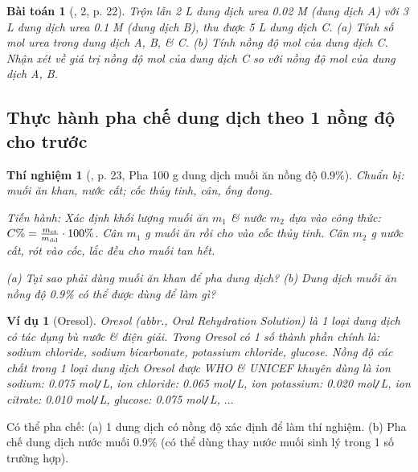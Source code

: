 \documentclass{article}
\newtheorem{baitoan}{Bài toán}
\newtheorem{thinghiem}{Thí nghiệm}
\newtheorem{vidu}{Ví dụ}
\begin{document}
\begin{baitoan}[\cite{SGK_KHTN_8_KNTTVCS}, 2, p. 22]
	Trộn lẫn \emph{2 L} dung dịch urea \emph{0.02 M} (dung dịch A) với \emph{3 L} dung dịch urea \emph{0.1 M} (dung dịch B), thu được \emph{5 L} dung dịch C. (a) Tính số mol urea trong dung dịch A, B, \& C. (b) Tính nồng độ mol của dung dịch C. Nhận xét về giá trị nồng độ mol của dung dịch C so với nồng độ mol của dung dịch A, B.
\end{baitoan}

\subsection{Thực hành pha chế dung dịch theo 1 nồng độ cho trước}

\begin{thinghiem}[\cite{SGK_KHTN_8_KNTTVCS}, p. 23, Pha 100 g dung dịch muối ăn nồng độ 0.9\%]
	\emph{Chuẩn bị:} muối ăn khan, nước cất; cốc thủy tinh, cân, ống đong.
	
	\emph{Tiến hành:} Xác định khối lượng muối ăn $m_1$ \& nước $m_2$ dựa vào công thức: $C\% = \frac{m_{\rm ct}}{m_{\rm dd}}\cdot100\%$. Cân $m_1$ g muối ăn rồi cho vào cốc thủy tinh. Cân $m_2$ g nước cất, rót vào cốc, lắc đều cho muối tan hết.
	
	(a) Tại sao phải dùng muối ăn khan để pha dung dịch? (b) Dung dịch muối ăn nồng độ \emph{0.9\%} có thể được dùng để làm gì?
\end{thinghiem}

\begin{vidu}[Oresol]
	\emph{Oresol} (abbr., Oral Rehydration Solution) là 1 loại dung dịch có tác dụng bù nước \& điện giải. Trong Oresol có 1 số thành phần chính là: sodium chloride, sodium bicarbonate, potassium chloride, glucose. Nồng độ các chất trong 1 loại dung dịch Oresol được WHO \& UNICEF khuyên dùng là \emph{ion sodium: 0.075 mol\texttt{/}L, ion chloride: 0.065 mol\texttt{/}L, ion potassium: 0.020 mol\texttt{/}L, ion citrate: 0.010 mol\texttt{/}L, glucose: 0.075 mol\texttt{/}L, $\ldots$}
\end{vidu}
Có thể pha chế: (a) 1 dung dịch có nồng độ xác định để làm thí nghiệm. (b)  Pha chế dung dịch nước muối 0.9\% (có thể dùng thay nước muối sinh lý trong 1 số trường hợp).
\end{document}
